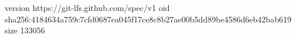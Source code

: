 version https://git-lfs.github.com/spec/v1
oid sha256:4184634a759c7cfd0687ea045f17ce8c8b27ae00b5dd89be4586d6eb42bab619
size 133056
